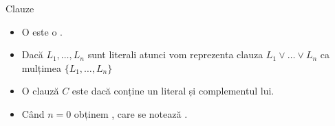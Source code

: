 \documentclass[xcolor=pdftex,romanian,colorlinks]{beamer}
\begin{document}
\begin{frame}{Clauze}

\begin{itemize}
\item  O  este o .

\medskip 

\item Dacă $L_1,\ldots, L_n$ sunt literali atunci vom reprezenta clauza
$L_1\vee\ldots\vee L_n$ ca mulțimea
$\{L_1,\ldots, L_n\}$

\begin{center}
\end{center}



\medskip 
\item O clauză $C$ este  dacă conține un literal și complementul lui. 

\medskip 
\item Când $n=0$ obținem , care se notează \intens{$\Box$}. 


%


\end{itemize}
 
\end{frame}






\end{document}
